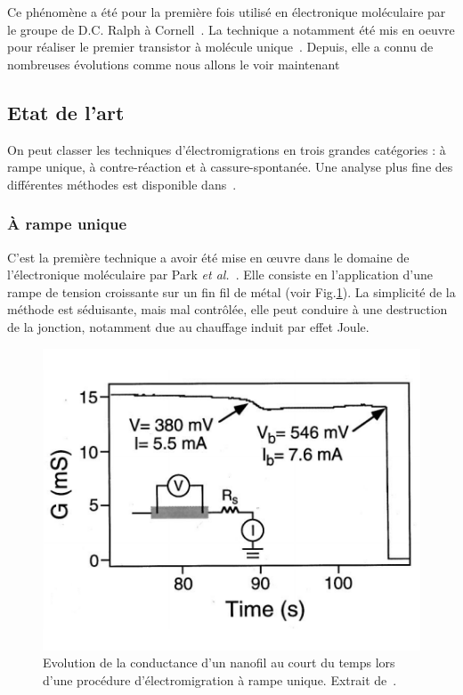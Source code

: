 Ce phénomène a été pour la première fois utilisé en électronique moléculaire par le groupe de D.C. Ralph à Cornell~\cite{Park1999}. La technique a notamment été mis en oeuvre pour réaliser le premier transistor à molécule unique~\cite{Park2000}. Depuis, elle a connu de nombreuses évolutions comme nous allons le voir maintenant

\subsection{Etat de l'art}
On peut classer les techniques d'électromigrations en trois grandes catégories : à rampe unique, à contre-réaction et à cassure-spontanée. Une analyse plus fine des différentes méthodes est disponible dans~\cite{Girod2012}.

\subsubsection{À rampe unique}
C'est la première technique a avoir été mise en œuvre dans le domaine de l'électronique moléculaire par Park \textit{et al.}~\cite{Park1999}. Elle consiste en l'application d'une rampe de tension croissante sur un fin fil de métal (voir Fig.\ref{ParkExemp}). La simplicité de la méthode est séduisante, mais mal contrôlée, elle peut conduire à une destruction de la jonction, notamment due au chauffage induit par effet Joule.

\begin{figure}
\parbox{7cm}{
\includegraphics[scale=0.45]{Fabrication/ElecMigExemp/ParkFig.pdf} 
}
\parbox{6.5cm}{\caption{Evolution de la conductance d'un nanofil au court du temps lors d'une procédure d'électromigration à rampe unique. Extrait de~\cite{Park1999}.}
\label{ParkExemp}
}
\end{figure}



